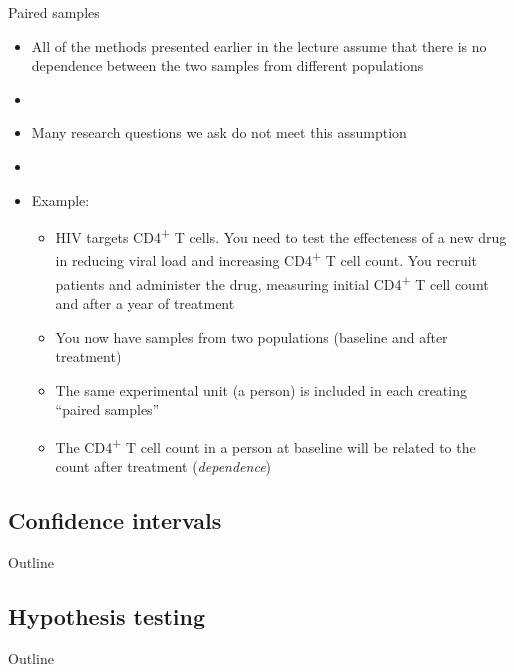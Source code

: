 \documentclass[xcolor=dvipsnames]{beamer}
\begin{document}
\begin{frame}{Paired samples}
\begin{itemize}
	\item All of the methods presented earlier in the lecture assume that there is no dependence between the two samples from different populations
	\item[]
	\item Many research questions we ask do not meet this assumption
	\item[]
	\item Example: 
	\begin{itemize}
		\item HIV targets CD4\textsuperscript{+} T cells. You need to test the effecteness of a new drug in reducing viral load and increasing CD4\textsuperscript{+} T cell count. You recruit patients and administer the drug, measuring initial CD4\textsuperscript{+} T cell count and after a year of treatment
		\item You now have samples from two populations (baseline and after treatment)
		\item The same experimental unit (a person) is included in each creating ``paired samples''
		\item The CD4\textsuperscript{+} T cell count in a person at baseline will be related to the count after treatment (\emph{dependence})
	\end{itemize}
\end{itemize}
\end{frame}

\subsection{Confidence intervals}
\begin{frame}{Outline}
\tableofcontents[currentsection,subsectionstyle=show/shaded/hide]
\end{frame}


\subsection{Hypothesis testing}
\begin{frame}{Outline}
\tableofcontents[currentsection,subsectionstyle=show/shaded/hide]
\end{frame}
\end{document}
